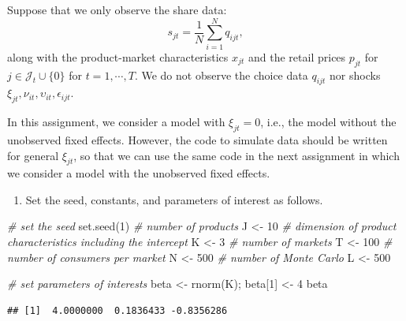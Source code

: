 \documentclass[
]{book}
\newenvironment{Shaded}{\begin{snugshade}}{\end{snugshade}}
\newcommand{\CommentTok}[1]{\textcolor[rgb]{0.56,0.35,0.01}{\textit{#1}}}
\newcommand{\DecValTok}[1]{\textcolor[rgb]{0.00,0.00,0.81}{#1}}
\newcommand{\FunctionTok}[1]{\textcolor[rgb]{0.00,0.00,0.00}{#1}}
\newcommand{\NormalTok}[1]{#1}
\newcommand{\OtherTok}[1]{\textcolor[rgb]{0.56,0.35,0.01}{#1}}
\providecommand{\tightlist}{%
  \setlength{\itemsep}{0pt}\setlength{\parskip}{0pt}}
\begin{document}
Suppose that we only observe the share data:
\[
s_{jt} = \frac{1}{N} \sum_{i = 1}^N q_{ijt},
\]
along with the product-market characteristics \(x_{jt}\) and the retail prices \(p_{jt}\) for \(j \in \mathcal{J}_t \cup \{0\}\) for \(t = 1, \cdots, T\). We do not observe the choice data \(q_{ijt}\) nor shocks \(\xi_{jt}, \nu_{it}, \upsilon_{it}, \epsilon_{ijt}\).

In this assignment, we consider a model with \(\xi_{jt} = 0\), i.e., the model without the unobserved fixed effects. However, the code to simulate data should be written for general \(\xi_{jt}\), so that we can use the same code in the next assignment in which we consider a model with the unobserved fixed effects.

\begin{enumerate}
\def\labelenumi{\arabic{enumi}.}
\tightlist
\item
  Set the seed, constants, and parameters of interest as follows.
\end{enumerate}

\begin{Shaded}
\begin{Highlighting}[]
\CommentTok{\# set the seed}
\FunctionTok{set.seed}\NormalTok{(}\DecValTok{1}\NormalTok{)}
\CommentTok{\# number of products}
\NormalTok{J }\OtherTok{\textless{}{-}} \DecValTok{10}
\CommentTok{\# dimension of product characteristics including the intercept}
\NormalTok{K }\OtherTok{\textless{}{-}} \DecValTok{3}
\CommentTok{\# number of markets}
\NormalTok{T }\OtherTok{\textless{}{-}} \DecValTok{100}
\CommentTok{\# number of consumers per market}
\NormalTok{N }\OtherTok{\textless{}{-}} \DecValTok{500}
\CommentTok{\# number of Monte Carlo}
\NormalTok{L }\OtherTok{\textless{}{-}} \DecValTok{500}
\end{Highlighting}
\end{Shaded}

\begin{Shaded}
\begin{Highlighting}[]
\CommentTok{\# set parameters of interests}
\NormalTok{beta }\OtherTok{\textless{}{-}} \FunctionTok{rnorm}\NormalTok{(K); }
\NormalTok{beta[}\DecValTok{1}\NormalTok{] }\OtherTok{\textless{}{-}} \DecValTok{4}
\NormalTok{beta}
\end{Highlighting}
\end{Shaded}

\begin{verbatim}
## [1]  4.0000000  0.1836433 -0.8356286
\end{verbatim}
\end{document}
